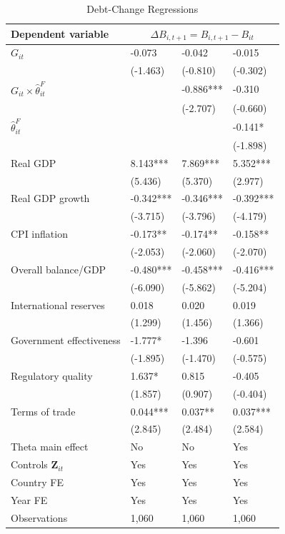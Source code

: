 \begin{table}[H]\centering
\begin{threeparttable}
\caption{Debt-Change Regressions}
\label{tab:debt_change}
\scriptsize
\setlength{\tabcolsep}{3.0pt}
\begin{tabularx}{\textwidth}{lYYY}
\toprule
Dependent variable &  \\
\midrule
$G_{it}$ & -0.073 & -0.042 & -0.015 \\
 & (-1.463) & (-0.810) & (-0.302) \\
$G_{it}\times\widehat\theta^F_{it}$ &  & -0.886*** & -0.310 \\
 &  & (-2.707) & (-0.660) \\
$\widehat\theta^F_{it}$ &  &  & -0.141* \\
 &  &  & (-1.898) \\
Real GDP & 8.143*** & 7.869*** & 5.352*** \\
 & (5.436) & (5.370) & (2.977) \\
Real GDP growth & -0.342*** & -0.346*** & -0.392*** \\
 & (-3.715) & (-3.796) & (-4.179) \\
CPI inflation & -0.173** & -0.174** & -0.158** \\
 & (-2.053) & (-2.060) & (-2.070) \\
Overall balance/GDP & -0.480*** & -0.458*** & -0.416*** \\
 & (-6.090) & (-5.862) & (-5.204) \\
International reserves & 0.018 & 0.020 & 0.019 \\
 & (1.299) & (1.456) & (1.366) \\
Government effectiveness & -1.777* & -1.396 & -0.601 \\
 & (-1.895) & (-1.470) & (-0.575) \\
Regulatory quality & 1.637* & 0.815 & -0.405 \\
 & (1.857) & (0.907) & (-0.404) \\
Terms of trade & 0.044*** & 0.037** & 0.037*** \\
 & (2.845) & (2.484) & (2.584) \\
\midrule
Theta main effect & No & No & Yes \\
Controls $\mathbf{Z}_{it}$ & Yes & Yes & Yes \\
Country FE & Yes & Yes & Yes \\
Year FE & Yes & Yes & Yes \\
Observations & 1,060 & 1,060 & 1,060 \\

\end{tabularx}
\end{threeparttable}
\end{table}
